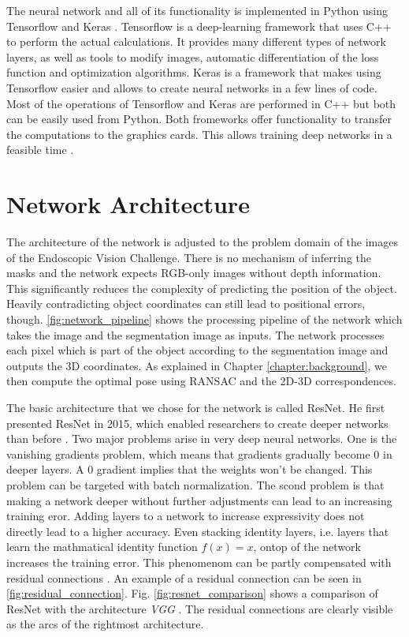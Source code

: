 The neural network and all of its functionality is implemented in Python using Tensorflow \cite{tensorflow} and Keras \cite{keras}. Tensorflow is a deep-learning framework that uses C++ to perform the actual calculations. It provides many different types of network layers, as well as tools to modify images, automatic differentiation of the loss function and optimization algorithms. Keras is a framework that makes using Tensorflow easier and allows to create neural networks in a few lines of code. Most of the operations of Tensorflow and Keras are performed in C++ but both can be easily used from Python. Both fromeworks offer functionality to transfer the computations to the graphics cards. This allows training deep networks in a feasible time \cite{ylecun}.

\section{Network Architecture}

The architecture of the network is adjusted to the problem domain of the images of the Endoscopic Vision Challenge. There is no mechanism of inferring the masks and the network expects RGB-only images without depth information. This significantly reduces the complexity of predicting the position of the object. Heavily contradicting object coordinates can still lead to positional errors, though. \fig \ref{fig:network_pipeline} shows the processing pipeline of the network which takes the image and the segmentation image as inputs. The network processes each pixel which is part of the object according to the segmentation image and outputs the 3D coordinates. As explained in Chapter \ref{chapter:background}, we then compute the optimal pose using RANSAC and the 2D-3D correspondences.

The basic architecture that we chose for the network is called ResNet. He \etal first presented ResNet in 2015, which enabled researchers to create deeper networks than before \cite{resnet}. Two major problems arise in very deep neural networks. One is the vanishing gradients problem, which means that gradients gradually become 0 in deeper layers. A 0 gradient implies that the weights won't be changed. This problem can be targeted with batch normalization. The scond problem is that making a network deeper without further adjustments can lead to an increasing training eror. Adding layers to a network to increase expressivity does not directly lead to a higher accuracy. Even stacking identity layers, i.e. layers that learn the mathmatical identity function $f(x) = x$, ontop of the network increases the training error. This phenomenom can be partly compensated with residual connections \cite{resnet}. An example of a residual connection can be seen in \fig \ref{fig:residual_connection}. Fig. \ref{fig:resnet_comparison} shows a comparison of ResNet with the architecture \textit{VGG} \cite{vgg}. The residual connections are clearly visible as the arcs of the rightmost architecture.

